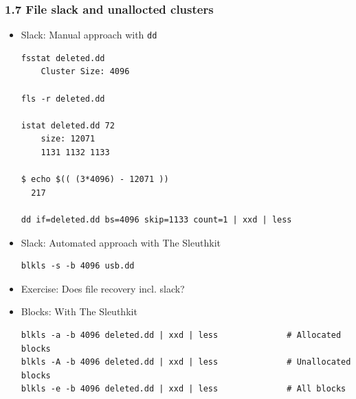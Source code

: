 \begin{frame}[fragile]
  \frametitle{1.7 File slack and unallocted clusters}
    \begin{itemize}
	    \item Slack: Manual approach with \texttt{dd}
  \begin{lstlisting}[basicstyle=\tiny]
fsstat deleted.dd
    Cluster Size: 4096

fls -r deleted.dd

istat deleted.dd 72
    size: 12071
    1131 1132 1133

$ echo $(( (3*4096) - 12071 ))
  217

dd if=deleted.dd bs=4096 skip=1133 count=1 | xxd | less 
  \end{lstlisting}
	    \item Slack: Automated approach with The Sleuthkit
  \begin{lstlisting}[basicstyle=\tiny]
blkls -s -b 4096 usb.dd
  \end{lstlisting}
	    \item Exercise: Does file recovery incl. slack?
	    \item Blocks: With The Sleuthkit
  \begin{lstlisting}[basicstyle=\tiny]
blkls -a -b 4096 deleted.dd | xxd | less              # Allocated blocks
blkls -A -b 4096 deleted.dd | xxd | less              # Unallocated blocks
blkls -e -b 4096 deleted.dd | xxd | less              # All blocks
  \end{lstlisting}
    \end{itemize}
\end{frame}





